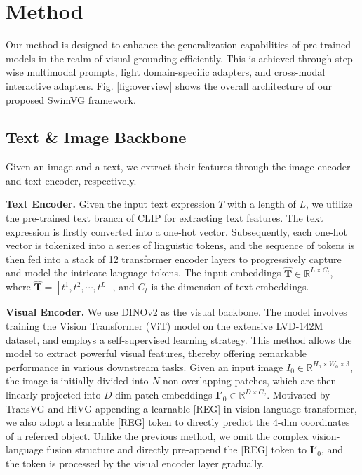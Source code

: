 \section{Method}

Our method is designed to enhance the generalization capabilities of pre-trained models in the realm of visual grounding efficiently. This is achieved through step-wise multimodal prompts, light domain-specific adapters, and cross-modal interactive adapters. Fig. \ref{fig:overview} shows the overall architecture of our proposed SwimVG framework. 



\subsection{Text \& Image Backbone}
Given an image and a text, we extract their features through the image encoder and text encoder, respectively.

\noindent
\textbf{Text Encoder.} Given the input text expression $T$ with a length of $L$, we utilize the pre-trained text branch of CLIP \cite{radford2021learning} for extracting text features. The text expression is firstly converted into a one-hot vector. Subsequently, each one-hot vector is tokenized into a series of linguistic tokens, and the sequence of tokens is then fed into a stack of 12 transformer encoder layers to progressively capture and model the intricate language tokens.
The input embeddings $\bm{\hat T} \in \mathbb{R}^{L\times C_t}$, where $\bm{\hat T} = [t^1, t^2, \cdots, t^L]$, and $C_t$ is the dimension of text embeddings. 


\label{text encoder:clip}


% 

\noindent
\textbf{Visual Encoder.} 
We use DINOv2 \cite{oquab2023dinov2} as the visual backbone. The model involves training the Vision Transformer (ViT) model \cite{dosovitskiy2020vit} on the extensive LVD-142M dataset, and employs a self-supervised learning strategy. This method allows the model to extract powerful visual features, thereby offering remarkable performance in various downstream tasks. Given an input image
${I}_0 \in \mathbb{R}^{H_0\times W_0\times3}$, the image is initially divided into $N$ non-overlapping patches, which are then linearly projected into $D$-dim patch embeddings $\bm{I'}_0 \in \mathbb{R}^{D\times C_v}$. Motivated by TransVG \cite{deng2021transvg} and HiVG \cite{xiao2024hivg} appending a learnable [REG] in vision-language transformer, we also adopt a learnable [REG] token to directly predict the 4-dim coordinates of a referred object. Unlike the previous method, we omit the complex vision-language fusion structure and directly pre-append the [REG] token to $\bm{I'}_0$, and the token is processed by the visual encoder layer gradually.


